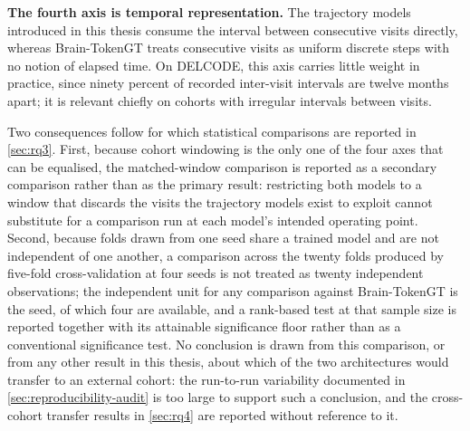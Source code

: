 \textbf{The fourth axis is temporal representation.} The trajectory models introduced in this thesis
consume the interval between consecutive visits directly, whereas Brain-TokenGT treats
consecutive visits as uniform discrete steps with no notion of elapsed time. On
\ac{DELCODE}, this axis carries little weight in practice, since ninety percent of recorded
inter-visit intervals are twelve months apart; it is relevant chiefly on cohorts with
irregular intervals between visits.

Two consequences follow for which statistical comparisons are reported in
\autoref{sec:rq3}. First, because cohort windowing is the only one of the four axes that
can be equalised, the matched-window comparison is reported as a secondary comparison
rather than as the primary result: restricting both models to a window that discards the
visits the trajectory models exist to exploit cannot substitute for a comparison run at
each model's intended operating point. Second, because folds drawn from one seed share a
trained model and are not independent of one another, a comparison across the twenty folds
produced by five-fold cross-validation at four seeds is not treated as twenty independent
observations; the independent unit for any comparison against Brain-TokenGT is the seed, of
which four are available, and a rank-based test at that sample size is reported together
with its attainable significance floor rather than as a conventional significance test. No
conclusion is drawn from this comparison, or from any other result in this thesis, about
which of the two architectures would transfer to an external cohort: the run-to-run
variability documented in \autoref{sec:reproducibility-audit} is too large to support such
a conclusion, and the cross-cohort transfer results in \autoref{sec:rq4} are reported
without reference to it.
